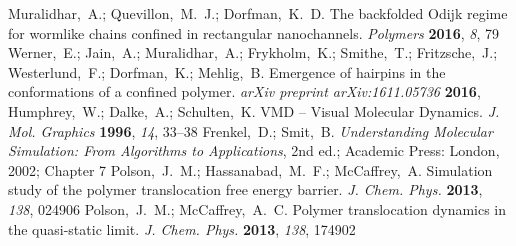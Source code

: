 \documentclass[journal=mamobx,manuscript=article,layout=twocolumn]{achemso}
\begin{document}
\begin{mcitethebibliography}{52}
\EndOfBibitem
{}
Muralidhar,~A.; Quevillon,~M.~J.; Dorfman,~K.~D. The backfolded Odijk regime
  for wormlike chains confined in rectangular nanochannels. \emph{Polymers}
  \textbf{2016}, \emph{8}, 79\relax
\mciteBstWouldAddEndPuncttrue
\mciteSetBstMidEndSepPunct{\mcitedefaultmidpunct}
{\mcitedefaultendpunct}{\mcitedefaultseppunct}\relax
\EndOfBibitem
{}
Werner,~E.; Jain,~A.; Muralidhar,~A.; Frykholm,~K.; Smithe,~T.; Fritzsche,~J.;
  Westerlund,~F.; Dorfman,~K.; Mehlig,~B. Emergence of hairpins in the
  conformations of a confined polymer. \emph{arXiv preprint arXiv:1611.05736}
  \textbf{2016}, \relax
\mciteBstWouldAddEndPunctfalse
\mciteSetBstMidEndSepPunct{\mcitedefaultmidpunct}
{}{\mcitedefaultseppunct}\relax
\EndOfBibitem
{}
Humphrey,~W.; Dalke,~A.; Schulten,~K. {VMD} -- {V}isual {M}olecular {D}ynamics.
  \emph{J. Mol. Graphics} \textbf{1996}, \emph{14}, 33--38\relax
\mciteBstWouldAddEndPuncttrue
\mciteSetBstMidEndSepPunct{\mcitedefaultmidpunct}
{\mcitedefaultendpunct}{\mcitedefaultseppunct}\relax
\EndOfBibitem
{}
Frenkel,~D.; Smit,~B. \emph{Understanding Molecular Simulation: From Algorithms
  to Applications}, 2nd ed.; Academic Press: London, 2002; Chapter 7\relax
\mciteBstWouldAddEndPuncttrue
\mciteSetBstMidEndSepPunct{\mcitedefaultmidpunct}
{\mcitedefaultendpunct}{\mcitedefaultseppunct}\relax
\EndOfBibitem
{}
Polson,~J.~M.; Hassanabad,~M.~F.; McCaffrey,~A. Simulation study of the polymer
  translocation free energy barrier. \emph{J. Chem. Phys.} \textbf{2013},
  \emph{138}, 024906\relax
\mciteBstWouldAddEndPuncttrue
\mciteSetBstMidEndSepPunct{\mcitedefaultmidpunct}
{\mcitedefaultendpunct}{\mcitedefaultseppunct}\relax
\EndOfBibitem
{}
Polson,~J.~M.; McCaffrey,~A.~C. Polymer translocation dynamics in the
  quasi-static limit. \emph{J. Chem. Phys.} \textbf{2013}, \emph{138},
  174902\relax
\mciteBstWouldAddEndPuncttrue
\mciteSetBstMidEndSepPunct{\mcitedefaultmidpunct}
{\mcitedefaultendpunct}{\mcitedefaultseppunct}\relax
\EndOfBibitem
{}

\end{mcitethebibliography}
\end{document}

